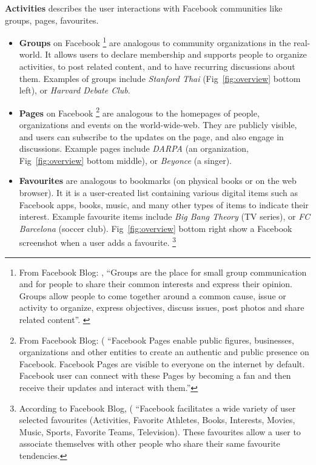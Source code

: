 {\bf Activities} describes the user interactions with Facebook communities like groups, pages, favourites.
\begin{itemize}
\item \textbf{Groups} on Facebook 
\footnote{From Facebook Blog: 
, ``Groups are the place for small group communication and for people to share their common interests and express their opinion. Groups allow people to come together around a common cause, issue or activity to organize, express objectives, discuss issues, post photos and share related content''. 
\label{fn:fbblog}}
are analogous to community organizations in the real-world. It allows users to declare membership and supports people to organize activities, to post related content, and to have recurring discussions about them.  Examples of groups include {\em Stanford Thai} (Fig~\ref{fig:overview} bottom left), or {\em Harvard Debate Club}.
\item \textbf{Pages} on Facebook
  \footnote{From Facebook Blog: 
( ``Facebook Pages enable public figures, businesses, organizations and other entities to create an authentic and public presence on Facebook. Facebook Pages are visible to everyone on the internet by default. Facebook user can connect with these Pages by becoming a fan and then receive their updates and interact with them.'' }
  are analogous to the homepages of people, organizations and events on the world-wide-web. They are publicly visible, and users can subscribe to the updates on the page, and also engage in discussions. Example pages include {\em DARPA} (an organization, Fig~\ref{fig:overview} bottom middle), or {\em Beyonce} (a singer).
\item \textbf{Favourites} are analogous to bookmarks (on physical books or on the web browser). It it is a user-created list containing various digital items such as Facebook apps, books, music, and many other types of items to indicate their interest. Example favourite items include {\em Big Bang Theory} (TV series), or {\em FC Barcelona} (soccer club). Fig~\ref{fig:overview} bottom right show a Facebook screenshot when a user adds a favourite.
  \footnote{According to Facebook Blog, ( ``Facebook facilitates a wide variety of user selected favourites (Activities, Favorite Athletes, Books, Interests, Movies, Music, Sports, Favorite Teams, Television). These favourites allow a user to associate themselves with other people who share their same favourite tendencies.}
\end{itemize} 

